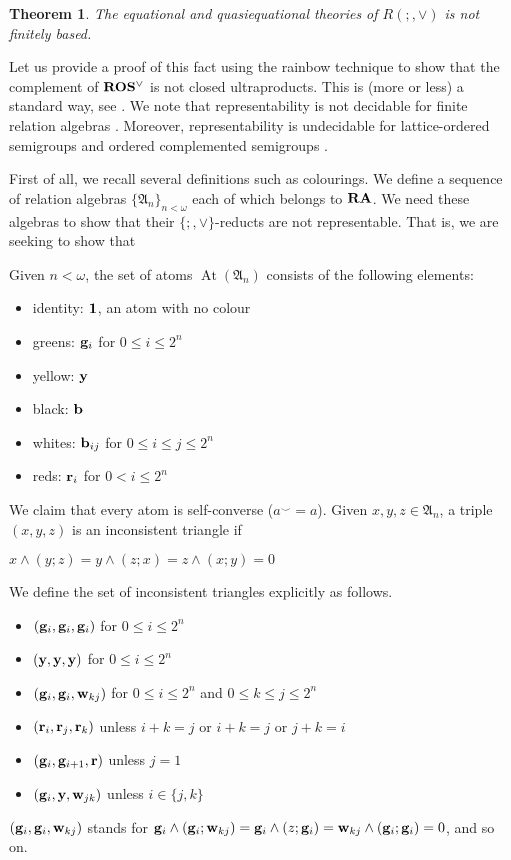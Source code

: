 \documentclass[a4paper]{article}
\theoremstyle{defin}
\theoremstyle{theorem}
\newtheorem{theorem}{Theorem}
\theoremstyle{prop}
\theoremstyle{lemma}
\theoremstyle{ex}
\theoremstyle{col}
\begin{document}
\begin{theorem}
  The equational and quasiequational theories of $R(;,\vee)$ is not finitely based.
\end{theorem}

Let us provide a proof of this fact using the rainbow technique \cite{hirsch2002relation} to show that the complement of ${\bf ROS^{\vee}}$ is not closed ultraproducts. This is (more or less) a standard way, see \cite{hodkinson2000axiomatizability}.
We note that representability is not decidable for finite relation algebras \cite{hirsch2001representability}. Moreover, representability is undecidable for lattice-ordered semigroups and ordered complemented semigroups \cite{neuzerling2016undecidability}.

First of all, we recall several definitions such as colourings. We define a sequence of relation algebras $\{ \mathfrak{A}_n \}_{n < \omega}$ each of which belongs to ${\bf RA}$. We need these algebras to show that their $\{;, \vee\}$-reducts are not representable. That is, we are seeking to show that

Given $n < \omega$, the set of atoms $\operatorname{At}(\mathfrak{A}_n)$ consists of the following elements:
\begin{itemize}
\item identity: ${\bf 1}$, an atom with no colour
\item greens: ${\bf g}_i$ for $0 \leq i \leq 2^n$
\item yellow: ${\bf y}$
\item black: ${\bf b}$
\item whites: ${\bf b}_{ij}$ for $0 \leq i \leq j \leq 2^n$
\item reds: ${\bf r}_i$ for $0 <i \leq 2^n$
\end{itemize}
We claim that every atom is self-converse ($a^{\smile} = a$). Given $x, y, z \in \mathfrak{A}_n$, a triple $(x,y,z)$ is an  inconsistent triangle if
\begin{center}
$x \land (y ; z) = y \land (z ; x) = z \land (x ; y) = 0$
\end{center}
We define the set of inconsistent triangles explicitly as follows.
\begin{itemize}
  \item $({\bf g}_i, {\bf g}_i, {\bf g}_i)$ for $0 \leq i \leq 2^n$
  \item $({\bf y}, {\bf y}, {\bf y})$ for $0 \leq i \leq 2^n$
  \item $({\bf g}_i, {\bf g}_i, {\bf w}_{kj})$ for $0 \leq i \leq 2^n$ and $0 \leq k \leq j \leq 2^n$
  \item $({\bf r}_i, {\bf r}_j, {\bf r}_k)$ unless $i + k = j$ or $i + k = j$ or $j + k = i$
  \item $({\bf g}_i, {\bf g}_{i + 1}, {\bf r})$ unless $j = 1$
  \item $({\bf g}_i, {\bf y}, {\bf w}_{jk})$ unless $i \in \{ j, k \}$
\end{itemize}
$({\bf g}_i, {\bf g}_i, {\bf w}_{kj})$ stands for ${\bf g}_i \land ({\bf g}_i ; {\bf w}_{kj}) = {\bf g}_i \land (z ; {\bf g}_i) = {\bf w}_{kj} \land ({\bf g}_i ; {\bf g}_i) = 0$, and so on.
\end{document}
